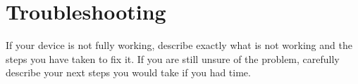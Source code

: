 \section{Troubleshooting}
If your device is not fully working, describe exactly what is not working and the steps you have taken to fix it. If you are still unsure of the problem, carefully describe your next steps you would take if you had time. 